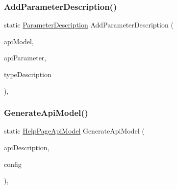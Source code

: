 \subsubsection{\texorpdfstring{Add\+Parameter\+Description()}{AddParameterDescription()}}
{\footnotesize\ttfamily static \hyperlink{classApi3Layers_1_1Areas_1_1HelpPage_1_1ModelDescriptions_1_1ParameterDescription}{Parameter\+Description} Add\+Parameter\+Description (\begin{DoxyParamCaption}\item[{\hyperlink{classApi3Layers_1_1Areas_1_1HelpPage_1_1Models_1_1HelpPageApiModel}{Help\+Page\+Api\+Model}}]{api\+Model,  }\item[{Api\+Parameter\+Description}]{api\+Parameter,  }\item[{\hyperlink{classApi3Layers_1_1Areas_1_1HelpPage_1_1ModelDescriptions_1_1ModelDescription}{Model\+Description}}]{type\+Description }\end{DoxyParamCaption})\hspace{0.3cm}{\ttfamily [static]}, {\ttfamily [private]}}

\mbox{\label{classApi3Layers_1_1Areas_1_1HelpPage_1_1HelpPageConfigurationExtensions_a3008459bcff41d3002541c3ff407e712}} 
\subsubsection{\texorpdfstring{Generate\+Api\+Model()}{GenerateApiModel()}}
{\footnotesize\ttfamily static \hyperlink{classApi3Layers_1_1Areas_1_1HelpPage_1_1Models_1_1HelpPageApiModel}{Help\+Page\+Api\+Model} Generate\+Api\+Model (\begin{DoxyParamCaption}\item[{Api\+Description}]{api\+Description,  }\item[{Http\+Configuration}]{config }\end{DoxyParamCaption})\hspace{0.3cm}{\ttfamily [static]}, {\ttfamily [private]}}


